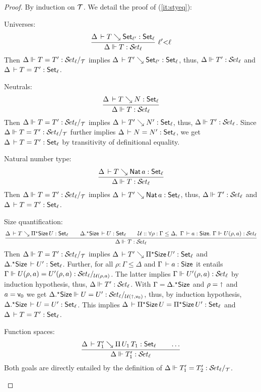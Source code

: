 \documentclass[acmlarge,review,anonymous]{acmart}\settopmatter{printfolios=true}
\begin{document}
\begin{proof}
  By induction on $\T$.  We detail the proof of (\ref{it:styeq}):
\begin{caselist}

\nextcase Universes:
\[
  \rux{\Delta \der T \evalsto \Set[\ell'] : \Set[\ell]
     }{\sty \Delta T \ell
     }{\ell' {<} \ell}
\]
Then $\steqd \Delta T {T'} \ell {\T}$ implies $\Delta \der T' \evalsto \Set[\ell'] : \Set[\ell]$, thus,
$\sty \Delta {T'} \ell$ and $\Delta \der T = T' : \Set[\ell]$.

\nextcase Neutrals:
\[
  \ru{\Delta \der T \evalsto N : \Set[\ell]
    }{\sty \Delta T \ell}
\]
Then $\steqd \Delta T {T'} \ell {\T}$ implies $\Delta \der T' \evalsto N' : \Set[\ell]$, thus,
$\sty \Delta {T'} \ell$.
Since $\steqd \Delta T {T'} \ell {\T}$ further implies $\Delta \der N = N' : \Set[\ell]$, we get
$\Delta \der T = T' : \Set[\ell]$ by transitivity of definitional equality.

\nextcase Natural number type:
\[
  \ru{\Delta \der T \evalsto \Nat a : \Set[\ell]
    }{\sty \Delta T \ell}
\]
Then $\steqd \Delta T {T'} \ell {\T}$ implies $\Delta \der T' \evalsto \Nat a : \Set[\ell]$, thus,
$\sty \Delta {T'} \ell$ and $\Delta \der T = T' : \Set[\ell]$.


\nextcase Size quantification:
\[
  \rul{\Delta \der T \evalsto \epiT \Size U : \Set[\ell] \qquad
       \eext \Delta \Size \der U : \Set[\ell] \qquad
      \U :: \forall \rho : \Gamma \leq \Delta,~\Gamma \der a : \Size.~
        \sty \Gamma {U(\rho,a)} \ell \\
    }{\sty \Delta {T} \ell}
\]
Then $\steqd \Delta T {T'} \ell {\T}$ implies $\Delta \der T' \evalsto \epiT \Size {U'} : \Set[\ell]$
and $\eext \Delta \Size \der U' : \Set[\ell]$. Further,
for all $\rho : \Gamma \leq \Delta$ and $\Gamma \der a : \Size$
it entails $\steqd \Gamma {U(\rho,a)} {U'(\rho,a)} \ell {\U(\rho,a)}$.
The latter implies $\sty \Gamma {U'(\rho,a)} \ell$ by induction hypothesis, thus,
$\sty \Delta {T'} \ell$.
With $\Gamma = \eext \Delta \Size$ and $\rho = \slift$ and $a = \ind 0$ we get
$\steqd {\eext \Delta \Size} {U} {U'} {\ell} {\U(\slift,\ind 0)}$, thus, by induction hypothesis,
$\eext \Delta \Size \der U = U' : \Set[\ell]$. This implies
$\Delta \der \epiT \Size U = \epiT \Size U' : \Set[\ell]$
and $\Delta \der T = T' : \Set[\ell]$.

\nextcase Function spaces:
\[
  \rul{\Delta \der T_1' \evalsto \piT {U_1} {T_1} : \Set[\ell] \qquad \dots
    }{\sty \Delta {T_1'} \ell}
\]
Both goals are directly entailed by the definition of $\steqd \Delta {T_1'} {T_2'} \ell {\T}$.

\end{caselist}
\end{proof}
\end{document}

